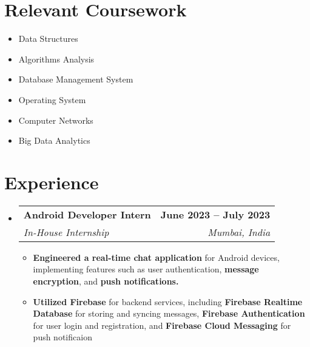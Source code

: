 \documentclass[letterpaper,11pt]{article}
\makeatletter
\newcommand{\resumeItem}[1]{
  \item\small{
    {#1 \vspace{-2pt}}
  }
}
\newcommand{\resumeSubheading}[4]{
  \vspace{-2pt}\item
    \begin{tabular*}{1.0\textwidth}[t]{l@{\extracolsep{\fill}}r}
      \textbf{#1} & \textbf{\small #2} \\
      \textit{\small#3} & \textit{\small #4} \\
    \end{tabular*}\vspace{-7pt}
}
\newcommand{\resumeSubHeadingListStart}{\begin{itemize}[leftmargin=0.0in, label={}]}
\newcommand{\resumeSubHeadingListEnd}{\end{itemize}}
\newcommand{\resumeItemListStart}{\begin{itemize}}
\newcommand{\resumeItemListEnd}{\end{itemize}\vspace{-5pt}}
\makeatother
\begin{document}
\section{Relevant Coursework}
        \begin{multicols}{3}
            \begin{itemize}[itemsep=-5pt, parsep=3pt]
                \item\small Data Structures
                \item Algorithms Analysis
                \item Database Management System
                \item Operating System
                \item Computer Networks
                \item Big Data Analytics
            \end{itemize}
        \end{multicols}
        \vspace*{2.0\multicolsep}


\section{Experience}
  \resumeSubHeadingListStart

    \resumeSubheading
      {Android Developer Intern }{June 2023 -- July 2023}
      {In-House Internship  }{Mumbai, India}
      \resumeItemListStart
        \resumeItem{\textbf{Engineered a real-time chat application} for Android devices, implementing features such as user authentication,\textbf{ message encryption}, and \textbf{push notifications.} }
        \resumeItem{\textbf{Utilized Firebase} for backend services, including \textbf{Firebase Realtime Database} for storing and syncing messages,\textbf{ Firebase Authentication} for user login and registration, and \textbf{Firebase Cloud Messaging} for push notificaion}
      \resumeItemListEnd
  \resumeSubHeadingListEnd
\vspace{-16pt}

\end{document}
